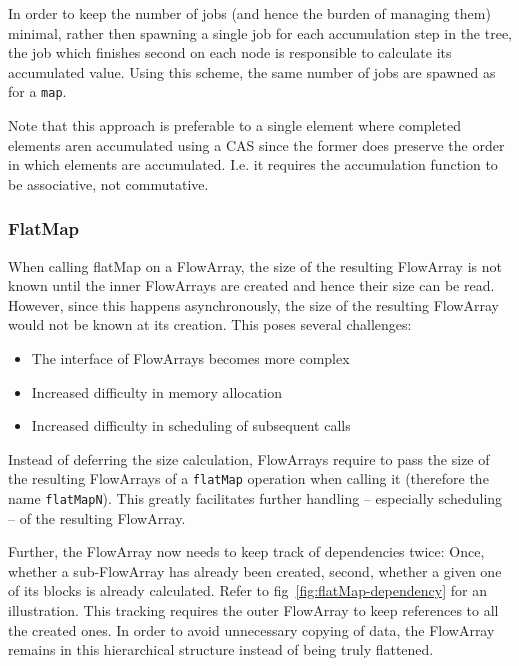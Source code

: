 \documentclass[runningheads,a4paper,fleqn]{llncs}
\begin{document}
In order to keep the number of jobs (and hence the burden of managing
them) minimal, rather then spawning a single job for each accumulation
step in the tree, the job which finishes second on each node is
responsible to calculate its accumulated value. Using this scheme, the
same number of jobs are spawned as for a \texttt{map}.

Note that this approach is preferable to a single element where
completed elements aren accumulated using a CAS since the former
does preserve the order in which elements are accumulated. I.e. it
requires the accumulation function to be associative, not
commutative.

\subsubsection{FlatMap}
\label{sssec:flatMapN}

When calling flatMap on a FlowArray, the size of the resulting
FlowArray is not known until the inner FlowArrays are created and
hence their size can be read. However, since this happens
asynchronously, the size of the resulting FlowArray would not be known
at its creation. This poses several challenges:

\begin{itemize}
\item The interface of FlowArrays becomes more complex
\item Increased difficulty in memory allocation
\item Increased difficulty in scheduling of subsequent calls
\end{itemize}

Instead of deferring the size calculation, FlowArrays require to pass
the size of the resulting FlowArrays of a \texttt{flatMap} operation
when calling it (therefore the name \texttt{flatMapN}). This greatly 
facilitates further handling -- especially scheduling -- of the
resulting FlowArray.

Further, the FlowArray now needs to keep track of dependencies twice:
Once, whether a sub-FlowArray has already been created, second,
whether a given one of its blocks is already calculated. Refer to
fig~\ref{fig:flatMap-dependency} for an illustration. This tracking
requires the outer FlowArray to keep references to all the created
ones. In order to avoid unnecessary copying of data, the FlowArray
remains in this hierarchical structure instead of being truly
flattened.
\end{document}
